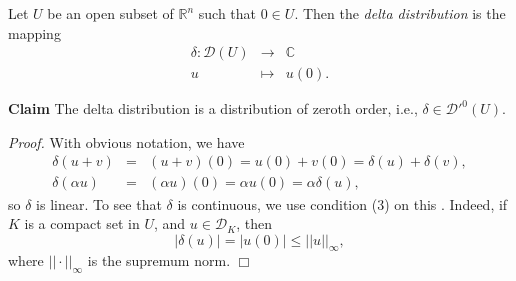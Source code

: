 \documentclass[12pt]{article}
\newcommand{\sR}[0]{\mathbb{R}}
\newcommand{\sC}[0]{\mathbb{C}}
\begin{document}
\newcommand{\cD}[0]{\mathcal{D}}

Let $U$ be an open subset of $\sR^n$ such that $0\in U$.
Then the \emph{delta distribution} is the mapping 
\begin{eqnarray*}
\delta : \cD(U) &\to & \sC \\
         u   &\mapsto & u(0).
\end{eqnarray*}

{\bf Claim} The delta distribution is a distribution of zeroth order, i.e.,
$\delta\in \cD'^0(U)$.

\emph{Proof.} With obvious notation, we have
\begin{eqnarray*}
\delta(u+v)&=&(u+v)(0)=u(0)+v(0) = \delta(u) + \delta(v),\\
\delta(\alpha u) &=& (\alpha u)(0)=\alpha u(0)=\alpha \delta(u),
\end{eqnarray*}
so $\delta$ is linear. To see that $\delta$ is continuous, we
use condition (3) on this .
Indeed, if $K$ is a compact set in $U$, and $u\in \cD_K$, then
$$ |\delta(u)| = |u(0)| \le ||u||_\infty,$$
where $||\cdot||_\infty$ is the supremum norm. $\Box$
\end{document}
